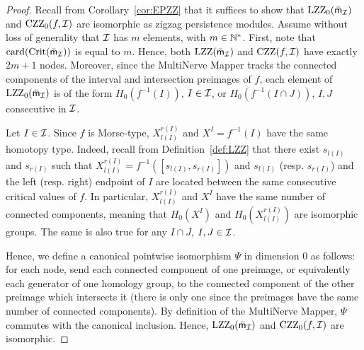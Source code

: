 \begin{proof}

Recall from Corollary~\ref{cor:EPZZ} that it suffices to show that 
$\mathrm{LZZ}_0(\bar {\sf{m}}_{\mathcal I})$ and $\mathrm{CZZ}_0(f,\mathcal{I})$ are isomorphic as zigzag persistence modules. 
Assume without loss of generality that $\mathcal{I}$ has $m$ elements, with $m\in\mathbb{N}^*$.
First, note 
that ${\rm card}(\mathrm{Crit}(\bar {\sf{m}}_{\mathcal I}))$ is equal to $m$. Hence, both $\mathrm{LZZ}(\bar {\sf{m}}_{\mathcal I})$ and $\mathrm{CZZ}(f,\mathcal{I})$ have exactly $2m+1$ nodes.
Moreover, since the MultiNerve Mapper tracks the connected components of the interval and intersection preimages of $f$,
each element of $\mathrm{LZZ}_0(\bar {\sf{m}}_{\mathcal I})$ is of the form $H_0(f^{-1}(I))$, $I\in\mathcal{I}$, or $H_0(f^{-1}(I\cap J))$, $I,J$ consecutive in $\mathcal{I}$.

Let $I\in\mathcal{I}$.
Since $f$ is Morse-type, $X_{l(I)}^{r(I)}$ and $X^I=f^{-1}(I)$ have the same 
homotopy type. Indeed, recall from Definition~\ref{def:LZZ} that there exist $s_{l(I)}$ and $s_{r(I)}$ such that 
$X_{l(I)}^{r(I)}=f^{-1}\left(\left[s_{l(I)},s_{r(I)}\right]\right)$ 
and $s_{l(I)}$ (resp. $s_{r(I)}$) and the left (resp. right) endpoint of $I$
are located between the same consecutive critical values of $f$.  
In particular, $X_{l(I)}^{r(I)}$ and $X^I$ have the same number of connected components, meaning that 
$H_0(X^I)$ and $H_0(X_{l(I)}^{r(I)})$ are isomorphic groups.
The same is also true for any $I\cap J$, $I,J\in\mathcal{I}$.

Hence, we define a canonical pointwise isomorphism $\Psi$ in dimension 0 as follows:
for each node, %
send each connected component of one preimage, or equivalently each generator of one homology group, 
to the connected component of the other preimage which intersects it 
(there is only one since the preimages have the same number of connected components). %
By definition of the MultiNerve Mapper, $\Psi$ commutes with the canonical inclusion.
Hence, $\mathrm{LZZ}_0(\bar {\sf{m}}_{\mathcal I})$ and $\mathrm{CZZ}_0(f,\mathcal{I})$ are isomorphic. %
\end{proof}













